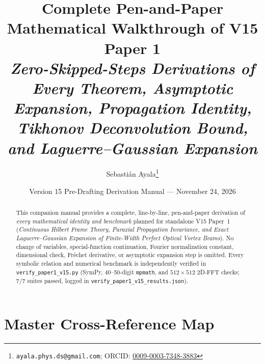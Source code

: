 \documentclass[10pt,letterpaper]{article}
\title{\vspace{-1.0cm}\textbf{\Large Complete Pen-and-Paper Mathematical Walkthrough of V15 Paper 1}\\[0.35em]
\large\textit{Zero-Skipped-Steps Derivations of Every Theorem, Asymptotic Expansion, Propagation Identity,\\
Tikhonov Deconvolution Bound, and Laguerre--Gaussian Expansion}}
\author{Sebasti\'an Ayala\thanks{\texttt{ayala.phys.ds@gmail.com}; ORCID: \href{https://orcid.org/0009-0003-7348-3883}{0009-0003-7348-3883}}}
\date{Version 15 Pre-Drafting Derivation Manual --- November 24, 2026}
\numberwithin{equation}{section}
\begin{document}
\maketitle
\thispagestyle{plain}

\begin{abstract}
\noindent This companion manual provides a complete, line-by-line, pen-and-paper derivation of \emph{every mathematical identity and benchmark} planned for standalone V15 Paper~1 (\emph{Continuous Hilbert Frame Theory, Paraxial Propagation Invariance, and Exact Laguerre--Gaussian Expansion of Finite-Width Perfect Optical Vortex Beams}). No change of variables, special-function continuation, Fourier normalization constant, dimensional check, Fr\'echet derivative, or asymptotic expansion step is omitted. Every symbolic relation and numerical benchmark is independently verified in \texttt{verify\_paper1\_v15.py} (SymPy, 40--50-digit \texttt{mpmath}, and $512\times 512$ 2D-FFT checks; 7/7 suites passed, logged in \texttt{verify\_paper1\_v15\_results.json}).
\end{abstract}

\tableofcontents
\vspace{0.5em}

\section*{Master Cross-Reference Map}
\end{document}
